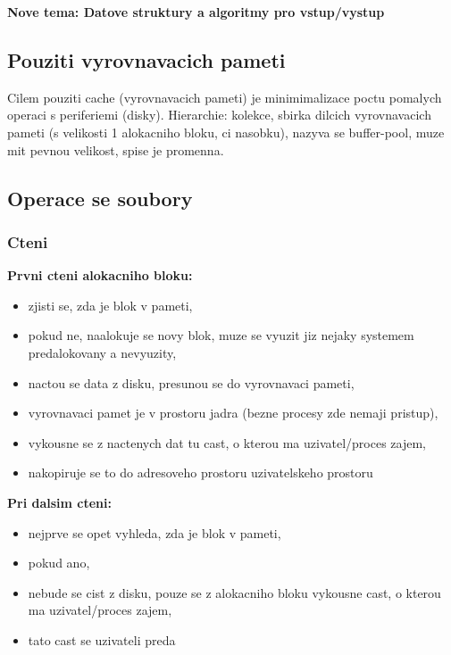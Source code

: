 \documentclass[a4paper, 11pt]{article}
\begin{document}
\newpage

\textbf{Nove tema: Datove struktury a algoritmy pro vstup/vystup}
\subsection{Pouziti vyrovnavacich pameti}
Cilem pouziti cache (vyrovnavacich pameti) je minimimalizace poctu pomalych operaci s periferiemi (disky). Hierarchie:
kolekce, sbirka dilcich vyrovnavacich pameti (s velikosti 1 alokacniho bloku, ci nasobku), nazyva se buffer-pool, muze mit pevnou velikost, spise je promenna. \\

\newpage

\subsection{Operace se soubory}

\subsubsection{Cteni}
\textbf{Prvni cteni alokacniho bloku:}
\begin{itemize}
    \item zjisti se, zda je blok v pameti,
    \item pokud ne, naalokuje se novy blok, muze se vyuzit jiz nejaky systemem predalokovany a nevyuzity,
    \item nactou se data z disku, presunou se do vyrovnavaci pameti,
    \item vyrovnavaci pamet je v prostoru jadra (bezne procesy zde nemaji pristup),
    \item vykousne se z nactenych dat tu cast, o kterou ma uzivatel/proces zajem,
    \item nakopiruje se to do adresoveho prostoru uzivatelskeho prostoru \\
\end{itemize}

\textbf{Pri dalsim cteni:}
\begin{itemize}
    \item nejprve se opet vyhleda, zda je blok v pameti,
    \item pokud ano,
    \item nebude se cist z disku, pouze se z alokacniho bloku vykousne cast, o kterou ma uzivatel/proces zajem,
    \item tato cast se uzivateli preda \\
\end{itemize}
\end{document}
